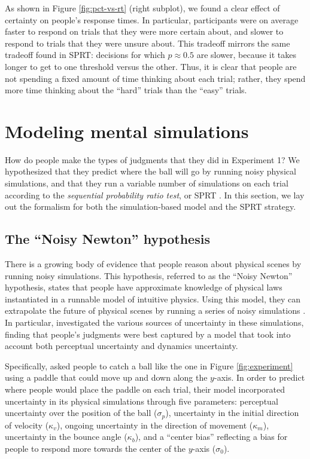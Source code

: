 \documentclass[10pt,letterpaper]{article}
\begin{document}
As shown in Figure \ref{fig:pct-vs-rt} (right subplot), we found a clear effect of certainty on people's response times. In particular, participants were on average faster to respond on trials that they were more certain about, and slower to respond to trials that they were unsure about. This tradeoff mirrors the same tradeoff found in SPRT: decisions for which $p\approx0.5$ are slower, because it takes longer to get to one threshold versus the other. Thus, it is clear that people are not spending a fixed amount of time thinking about each trial; rather, they spend more time thinking about the ``hard'' trials than the ``easy'' trials.

\section{Modeling mental simulations}

How do people make the types of judgments that they did in Experiment 1? We hypothesized that they predict where the ball will go by running noisy physical simulations, and that they run a variable number of simulations on each trial according to the \textit{sequential probability ratio test}, or SPRT \cite{wald1947sequential}. In this section, we lay out the formalism for both the simulation-based model and the SPRT strategy.

\subsection{The ``Noisy Newton'' hypothesis}

There is a growing body of evidence that people reason about physical scenes by running noisy simulations. This hypothesis, referred to as the ``Noisy Newton'' hypothesis, states that people have approximate knowledge of physical laws instantiated in a runnable model of intuitive physics. Using this model, they can extrapolate the future of physical scenes by running a series of noisy simulations \cite{Smith:2013fc,Battaglia2013,Smith:2013ug,Smith:2013th,Smith:2014tx,Ullman:2014ut,Hamrick:2015}. In particular,  investigated the various sources of uncertainty in these simulations, finding that people's judgments were best captured by a model that took into account both perceptual uncertainty and dynamics uncertainty.

Specifically,  asked people to catch a ball like the one in Figure \ref{fig:experiment} using a paddle that could move up and down along the $y$-axis. In order to predict where people would place the paddle on each trial, their model incorporated uncertainty in its physical simulations through five parameters: perceptual uncertainty over the position of the ball ($\sigma_p$), uncertainty in the initial direction of velocity ($\kappa_v$), ongoing uncertainty in the direction of movement ($\kappa_m$), uncertainty in the bounce angle ($\kappa_b$), and a ``center bias'' reflecting a bias for people to respond more towards the center of the $y$-axis ($\sigma_0$).
\end{document}
